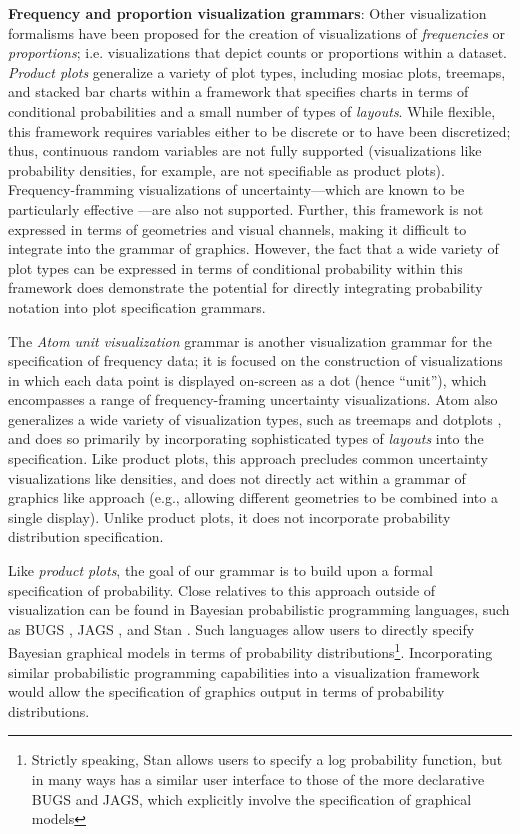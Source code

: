 \documentclass[11pt]{article}
\begin{document}
\noindent \textbf{Frequency and proportion visualization grammars}: Other visualization formalisms have been proposed for the creation of visualizations of \emph{frequencies} or \emph{proportions}; i.e. visualizations that depict counts or proportions within a dataset. \emph{Product plots} \cite{wickham_product_2011} generalize a variety of plot types, including mosiac plots, treemaps, and stacked bar charts within a framework that specifies charts in terms of conditional probabilities and a small number of types of \emph{layouts}. While flexible, this framework requires variables either to be discrete or to have been discretized; thus, continuous random variables are not fully supported (visualizations like probability densities, for example, are not specifiable as product plots). Frequency-framming visualizations of uncertainty---which are known to be particularly effective \cite{Fernandes2018, kay2016bus, Ancker2006, hullman2015hops, kale2018hypothetical, padilla2017effects, Padilla2015}---are also not supported. Further, this framework is not expressed in terms of geometries and visual channels, making it difficult to integrate into the grammar of graphics. However, the fact that a wide variety of plot types can be expressed in terms of conditional probability within this framework does demonstrate the potential for directly integrating probability notation into plot specification grammars.

The \emph{Atom} \emph{unit visualization} grammar \cite{Park2017} is another visualization grammar for the specification of frequency data; it is focused on the construction of visualizations in which each data point is displayed on-screen as a dot (hence ``unit''), which encompasses a range of frequency-framing uncertainty visualizations. Atom also generalizes a wide variety of visualization types, such as treemaps \cite{johnson1991tree} and dotplots \cite{Wilkinson1999dotplots}, and does so primarily by incorporating sophisticated types of \emph{layouts} into the specification. Like product plots, this approach precludes common uncertainty visualizations like densities, and does not directly act within a grammar of graphics like approach (e.g., allowing different geometries to be combined into a single display). Unlike product plots, it does not incorporate probability distribution specification.

Like \emph{product plots}, the goal of our grammar is to build upon a formal specification of probability. Close relatives to this approach outside of visualization can be found in Bayesian probabilistic programming languages, such as BUGS \cite{lunn2009bugs, lunn2000winbugs}, JAGS \cite{plummer2003jags}, and Stan \cite{carpenter2017stan}. Such languages allow users to directly specify Bayesian graphical models in terms of probability distributions\footnote{Strictly speaking, Stan allows users to specify a log probability function, but in many ways has a similar user interface to those of the more declarative BUGS and JAGS, which explicitly involve the specification of graphical models}. Incorporating similar probabilistic programming capabilities into a visualization framework would allow the specification of graphics output in terms of probability distributions.
\end{document}
